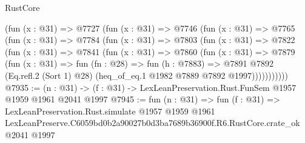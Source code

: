 \begin{lexlean}{RustCore}
\begin{coremodule}
    (fun (x : @31) =>
    @7727
      (fun (x : @31) =>
      @7746
        (fun (x : @31) =>
        @7765
          (fun (x : @31) =>
          @7784
            (fun (x : @31) =>
            @7803
              (fun (x : @31) =>
              @7822
                (fun (x : @31) =>
                @7841
                  (fun (x : @31) =>
                  @7860
                    (fun (x : @31) =>
                    @7879
                      (fun (x : @31) =>
                      fun (fn : @28) =>
                      fun (h : @7883) =>
                      @7891
                        @7892
                        (Eq.refl.{2} (Sort 1) @28)
                        (heq_of_eq.{1} @1982 @7889 @7892 @1997)))))))))))
@7935 := (n : @31) -> (f : @31) -> LexLeanPreservation.Rust.FunSem @1957 @1959 @1961 @2041 @1997
@7945 := fun (n : @31) =>
  fun (f : @31) =>
  LexLeanPreservation.Rust.simulate
    @1957
    @1959
    @1961
    LexLeanPreserve.C6059bd0b2a90027b0d3ba7689b36900f.R6.RustCore.crate_ok
    @2041
    @1997
\end{coremodule}
\end{lexlean}
